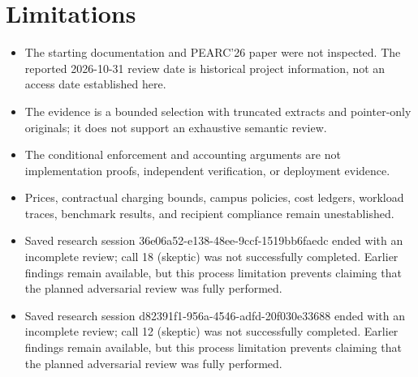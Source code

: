 \documentclass[11pt]{article}
\begin{document}
\section{Limitations}
\begin{itemize}
\item The starting documentation and PEARC\textquoteright{}26 paper were not inspected. The reported 2026-10-31 review date is historical project information, not an access date established here.
\item The evidence is a bounded selection with truncated extracts and pointer-only originals; it does not support an exhaustive semantic review.
\item The conditional enforcement and accounting arguments are not implementation proofs, independent verification, or deployment evidence.
\item Prices, contractual charging bounds, campus policies, cost ledgers, workload traces, benchmark results, and recipient compliance remain unestablished.
\item Saved research session 36e06a52-e138-48ee-9ccf-1519bb6faedc ended with an incomplete review; call 18 (skeptic) was not successfully completed. Earlier findings remain available, but this process limitation prevents claiming that the planned adversarial review was fully performed.
\item Saved research session d82391f1-956a-4546-adfd-20f030e33688 ended with an incomplete review; call 12 (skeptic) was not successfully completed. Earlier findings remain available, but this process limitation prevents claiming that the planned adversarial review was fully performed.
\end{itemize}
\end{document}

